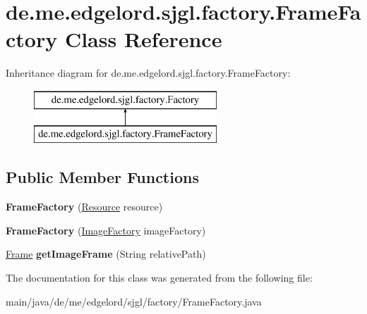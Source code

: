 \hypertarget{classde_1_1me_1_1edgelord_1_1sjgl_1_1factory_1_1_frame_factory}{}\section{de.\+me.\+edgelord.\+sjgl.\+factory.\+Frame\+Factory Class Reference}
\label{classde_1_1me_1_1edgelord_1_1sjgl_1_1factory_1_1_frame_factory}
Inheritance diagram for de.\+me.\+edgelord.\+sjgl.\+factory.\+Frame\+Factory\+:\begin{figure}[H]
\begin{center}
\leavevmode
\includegraphics[height=2.000000cm]{classde_1_1me_1_1edgelord_1_1sjgl_1_1factory_1_1_frame_factory}
\end{center}
\end{figure}
\subsection*{Public Member Functions}
\begin{DoxyCompactItemize}
\item 
\mbox{\label{classde_1_1me_1_1edgelord_1_1sjgl_1_1factory_1_1_frame_factory_a9e0d0b5a0807f2a2d6cbb467dfee4057}} 
{\bfseries Frame\+Factory} (\mbox{\hyperlink{interfacede_1_1me_1_1edgelord_1_1sjgl_1_1resource_1_1_resource}{Resource}} resource)
\item 
\mbox{\label{classde_1_1me_1_1edgelord_1_1sjgl_1_1factory_1_1_frame_factory_aebe90d501cdbf4fe4986af1e1b80fd9d}} 
{\bfseries Frame\+Factory} (\mbox{\hyperlink{classde_1_1me_1_1edgelord_1_1sjgl_1_1factory_1_1_image_factory}{Image\+Factory}} image\+Factory)
\item 
\mbox{\label{classde_1_1me_1_1edgelord_1_1sjgl_1_1factory_1_1_frame_factory_aa5cc626dd67417b578ec462ee5217994}} 
\mbox{\hyperlink{classde_1_1me_1_1edgelord_1_1sjgl_1_1cosmetic_1_1_frame}{Frame}} {\bfseries get\+Image\+Frame} (String relative\+Path)
\end{DoxyCompactItemize}


The documentation for this class was generated from the following file\+:\begin{DoxyCompactItemize}
\item 
main/java/de/me/edgelord/sjgl/factory/Frame\+Factory.\+java\end{DoxyCompactItemize}
